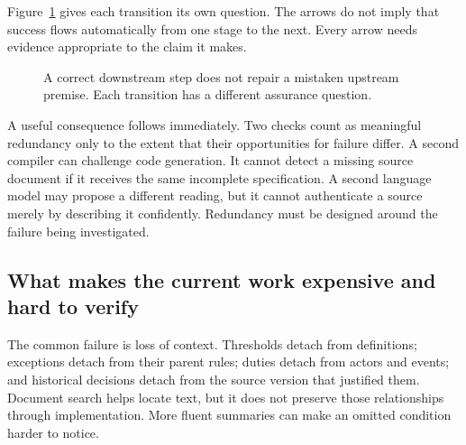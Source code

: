 Figure~\ref{fig:assurance-chain} gives each transition its own question. The
arrows do not imply that success flows automatically from one stage to the next. Every
arrow needs evidence appropriate to the claim it makes.

\begin{figure}[htbp]
\centering
{}
\caption{A correct downstream step does not repair a mistaken upstream premise.
Each transition has a different assurance question.}
\label{fig:assurance-chain}
\end{figure}

A useful consequence follows immediately. Two checks count as meaningful
redundancy only to the extent that their opportunities for failure differ. A
second compiler can challenge code generation. It cannot detect a missing source
document if it receives the same incomplete specification. A second language
model may propose a different reading, but it cannot authenticate a source merely
by describing it confidently. Redundancy must be designed around the failure
being investigated.

\subsection{What makes the current work expensive and hard to verify}
\label{merge:P-01-problem:05}


The common failure is loss of context. Thresholds detach from definitions;
exceptions detach from their parent rules; duties detach from actors and events;
and historical decisions detach from the source version that justified them.
Document search helps locate text, but it does not preserve those relationships
through implementation. More fluent summaries can make an omitted condition
harder to notice.

